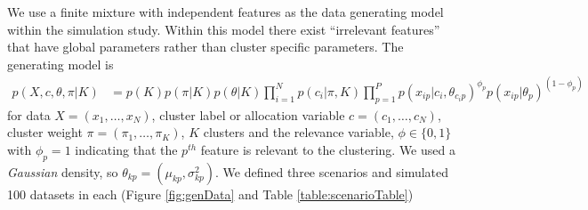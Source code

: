 \documentclass{article}
\begin{document}
We use a finite mixture with independent features as the data generating model within the simulation study.
Within this model there exist ``irrelevant features'' \citep{law2003feature} that have global parameters rather than cluster specific parameters. 
The generating model is
\begin{align*}
	p(X, c, \theta, \pi| K) &= p(K) p(\pi| K) p(\theta|K) \prod_{i=1}^N p (c_i | \pi, K)  \prod_{p=1}^P p(x_{ip} | c_i, \theta_{c_ip})^ {\phi_p} p(x_{ip} | \theta_p) ^ {(1 - \phi_p)}
\end{align*}
for data $X=(x_1, \ldots, x_N)$, cluster label or allocation variable $c=(c_1, \ldots, c_N)$, cluster weight $\pi=(\pi_1, \ldots, \pi_K)$, $K$ clusters and the relevance variable, $\phi \in \{0, 1\}$ with $\phi_p=1$ indicating that the $p^{th}$ feature is relevant to the clustering. We used a \emph{Gaussian} density, so $\theta_{kp} = (\mu_{kp}, \sigma^2_{kp})$. We defined three scenarios and simulated 100 datasets in each (Figure \ref{fig:genData} and Table \ref{table:scenarioTable}) 
\end{document}

